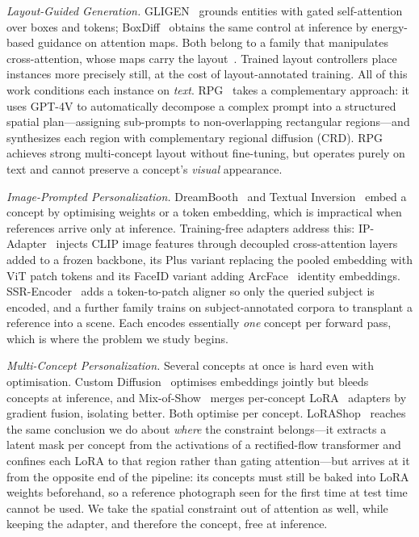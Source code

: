 \documentclass[review,10pt,times]{elsarticle}
\begin{document}
\noindent\textit{Layout-Guided Generation.}
GLIGEN~\cite{li2023gligen} grounds entities with gated self-attention over
boxes and tokens; BoxDiff~\cite{xie2023boxdiff} obtains the same control at
inference by energy-based guidance on attention maps.  Both belong to a family that manipulates
cross-attention, whose maps carry the layout~\cite{hertz2023prompt}.  Trained
layout controllers place instances more precisely still, at the cost of
layout-annotated training.  All of this work conditions each instance on
\emph{text}.
RPG~\cite{yang2024mastering} takes a complementary approach: it
uses GPT-4V to automatically decompose a complex prompt into a
structured spatial plan—assigning sub-prompts to non-overlapping
rectangular regions—and synthesizes each region with complementary
regional diffusion (CRD).  RPG achieves strong multi-concept layout
without fine-tuning, but operates purely on text and cannot preserve
a concept's \emph{visual} appearance.

\noindent\textit{Image-Prompted Personalization.}
DreamBooth~\cite{ruiz2023dreambooth} and Textual
Inversion~\cite{gal2022image} embed a concept by optimising weights or a
token embedding, which is impractical when references arrive only at
inference.  Training-free adapters address this: IP-Adapter~\cite{ye2023ip}
injects CLIP image features through decoupled cross-attention layers added to
a frozen backbone, its Plus variant replacing the pooled embedding with ViT
patch tokens and its FaceID variant adding
ArcFace~\cite{deng2019arcface} identity embeddings.
SSR-Encoder~\cite{zhang2024ssr} adds a token-to-patch aligner so only the
queried subject is encoded, and a further family trains on subject-annotated
corpora to transplant a reference into a scene.  Each encodes essentially \emph{one} concept per forward pass, which is where
the problem we study begins.

\noindent\textit{Multi-Concept Personalization.}
Several concepts at once is hard even with optimisation.  Custom
Diffusion~\cite{kumari2023multi} optimises embeddings jointly but bleeds
concepts at inference, and Mix-of-Show~\cite{gu2023mix} merges per-concept
LoRA~\cite{hu2022lora} adapters by gradient fusion, isolating better.  Both
optimise per concept.  LoRAShop~\cite{dalva2025lorashop} reaches the same conclusion we do about
\emph{where} the constraint belongs---it extracts a latent mask per concept
from the activations of a rectified-flow transformer and confines each LoRA to
that region rather than gating attention---but arrives at it from the opposite
end of the pipeline: its concepts must still be baked into LoRA weights
beforehand, so a reference photograph seen for the first time at test time
cannot be used.  We take the spatial constraint out of attention as well,
while keeping the adapter, and therefore the concept, free at inference.
\end{document}
